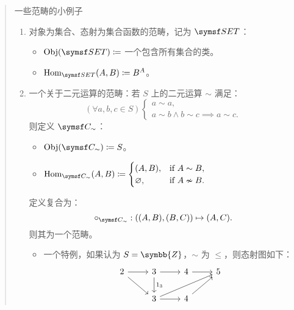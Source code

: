 \begin{quote}{一些范畴的小例子}
    \begin{enumerate}[label = \textbf{\arabic*.}]
        \item 对象为集合、态射为集合函数的范畴，记为 \(\SET\)：
              \begin{itemize}
                  \item \(\Obj(\SET) \coloneqq \) 一个包含所有集合的类。
                  \item \(\Hom_{\SET}(A,B) \coloneqq B^A\)。
              \end{itemize}
        \item 一个关于二元运算的范畴：若 \(S\) 上的二元运算 \(\sim\) 满足：
              \[
                  (\forall a,b,c\in S)\begin{cases}
                      a\sim a, \\
                      a\sim b\land b\sim c\implies a\sim c .
                  \end{cases}
              \]
              则定义 \(\symsf C_{\sim}\)：
              \begin{itemize}
                  \item \(\Obj\left( \symsf C_{\sim} \right) \coloneqq S\)。
                  \item \(\Hom_{\symsf C_{\sim}}(A,B)\coloneqq \begin{cases}
                            (A,B),       & \text{if }A\sim B,  \\
                            \varnothing, & \text{if }A\nsim B.
                        \end{cases}\)
              \end{itemize}
              定义复合为：
              \[
                  \circ _{\symsf C_{\sim}} :((A,B),(B,C))\mapsto (A,C)
                  .\]
              则其为一个范畴。
              \begin{itemize}
                  \item 一个特例，如果认为 \(S=\symbb{Z} \)，\(\sim\) 为 \(\leqslant \)，则态射图如下：
                        \[
                            \begin{tikzcd}
                                2\arrow[r]\arrow[rd] & 3\arrow[r]\arrow[d, "1_3"] & 4\arrow[r]  & 5  \\
                                {}                   & 3\arrow[r]\arrow[rru]      & 4\arrow[ru] & {}
                            \end{tikzcd}
                        \]

\end{itemize}
\end{enumerate}
\end{quote}

